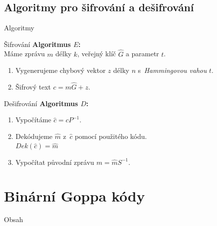 \documentclass{beamer}
\begin{document}
\subsection{Algoritmy pro šifrování a dešifrování}
\begin{frame}{Algoritmy}

    \begin{block}{Šifrování}
        \textbf{Algoritmus $E$:} \\
        Máme zprávu $m$ délky $k$, veřejný klíč $\hat{G}$ a parametr $t$.
        \begin{enumerate}
            \item Vygenerujeme chybový vektor $z$ délky $n$ s~\emph{Hammingovou
                vahou} $t$.
            \item Šifrový text $c = m \hat{G} + z$.
        \end{enumerate}
    \end{block}

\pause

    \begin{block}{Dešifrování}
        \textbf{Algoritmus $D$:}
        \begin{enumerate}
            \item Vypočítáme $\hat{c} = c P^{-1}$.
            \item Dekódujeme $\hat{m}$ z~$\hat{c}$ pomocí použitého kódu. \\
                $Dek(\hat{c}) = \hat{m}$
            \item Vypočítat původní zprávu $m = \hat{m} S^{-1}$.
        \end{enumerate}
    \end{block}

\end{frame}

\section{Binární Goppa kódy}
\begin{frame}{Obsah}
    \tableofcontents[currentsection]
\end{frame}
\end{document}
